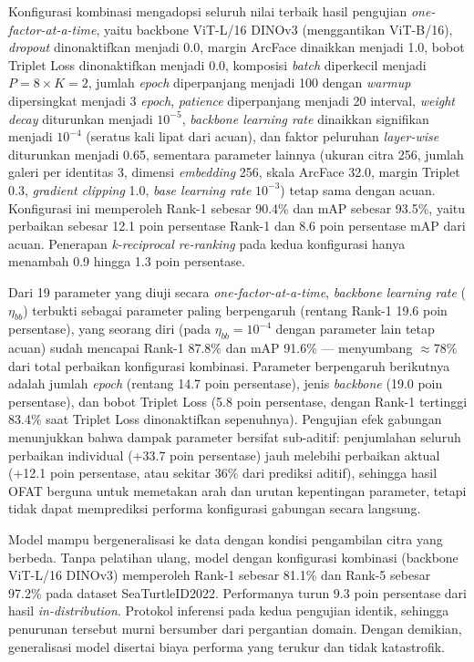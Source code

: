 Konfigurasi kombinasi mengadopsi seluruh nilai terbaik hasil pengujian
\textit{one-factor-at-a-time}, yaitu backbone ViT-L/16 DINOv3 (menggantikan
ViT-B/16), \textit{dropout} dinonaktifkan menjadi 0.0, margin ArcFace dinaikkan
menjadi 1.0, bobot Triplet Loss dinonaktifkan menjadi 0.0, komposisi
\textit{batch} diperkecil menjadi $P{=}8 \times K{=}2$, jumlah \textit{epoch}
diperpanjang menjadi 100 dengan \textit{warmup} dipersingkat menjadi 3
\textit{epoch}, \textit{patience} diperpanjang menjadi 20 interval,
\textit{weight decay} diturunkan menjadi $10^{-5}$, \textit{backbone learning
rate} dinaikkan signifikan menjadi $10^{-4}$ (seratus kali lipat dari acuan),
dan faktor peluruhan \textit{layer-wise} diturunkan menjadi 0.65, sementara
parameter lainnya (ukuran citra 256, jumlah galeri per identitas 3, dimensi
\textit{embedding} 256, skala ArcFace 32.0, margin Triplet 0.3,
\textit{gradient clipping} 1.0, \textit{base learning rate} $10^{-3}$) tetap
sama dengan acuan. Konfigurasi ini memperoleh Rank-1 sebesar 90.4\% dan mAP
sebesar 93.5\%, yaitu perbaikan sebesar 12.1 poin persentase Rank-1 dan 8.6
poin persentase mAP dari acuan. Penerapan \textit{k-reciprocal re-ranking} pada
kedua konfigurasi hanya menambah 0.9 hingga 1.3 poin persentase.

Dari 19 parameter yang diuji secara \textit{one-factor-at-a-time},
\textit{backbone learning rate} ($\eta_{bb}$) terbukti sebagai parameter paling
berpengaruh (rentang Rank-1 19.6 poin persentase), yang seorang diri (pada
$\eta_{bb}{=}10^{-4}$ dengan parameter lain tetap acuan) sudah mencapai Rank-1
87.8\% dan mAP 91.6\% --- menyumbang $\approx$78\% dari total perbaikan
konfigurasi kombinasi. Parameter berpengaruh berikutnya adalah jumlah
\textit{epoch} (rentang 14.7 poin persentase), jenis \textit{backbone} (19.0
poin persentase), dan bobot Triplet Loss (5.8 poin persentase, dengan Rank-1
tertinggi 83.4\% saat Triplet Loss dinonaktifkan sepenuhnya). Pengujian efek
gabungan menunjukkan bahwa dampak parameter bersifat sub-aditif: penjumlahan
seluruh perbaikan individual (+33.7 poin persentase) jauh melebihi perbaikan
aktual (+12.1 poin persentase, atau sekitar 36\% dari prediksi aditif),
sehingga hasil OFAT berguna untuk memetakan arah dan urutan kepentingan
parameter, tetapi tidak dapat memprediksi performa konfigurasi gabungan
secara langsung.

Model mampu bergeneralisasi ke data dengan kondisi pengambilan citra yang
berbeda. Tanpa pelatihan ulang, model dengan konfigurasi kombinasi (backbone
ViT-L/16 DINOv3) memperoleh Rank-1 sebesar 81.1\% dan Rank-5 sebesar 97.2\%
pada dataset SeaTurtleID2022. Performanya turun 9.3 poin persentase dari hasil
\textit{in-distribution}. Protokol inferensi pada kedua pengujian identik,
sehingga penurunan tersebut murni bersumber dari pergantian domain. Dengan
demikian, generalisasi model disertai biaya performa yang terukur dan tidak
katastrofik.

